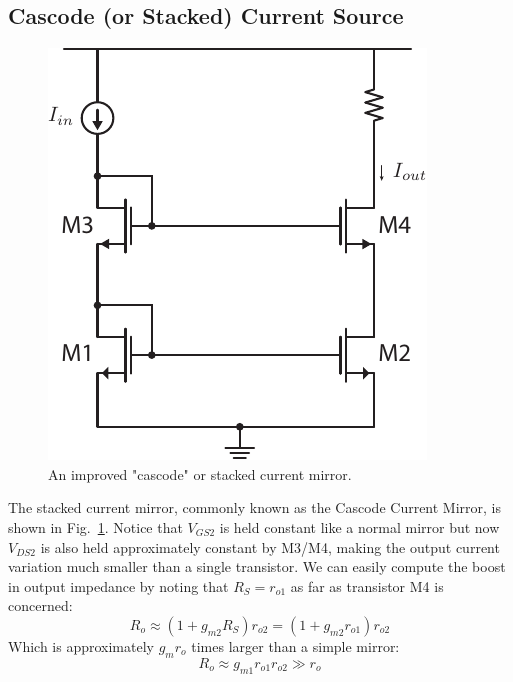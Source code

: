 \subsection{Cascode (or Stacked) Current Source}
\begin{figure}[tb]
\centering
\includegraphics[scale=1]{12mirror_cascode.pdf}
\caption{An improved "cascode" or stacked current mirror.}
\label{fig:12mirror_cascode.pdf}
\end{figure}
The stacked current mirror, commonly known as the Cascode Current Mirror, is shown in Fig.~\ref{fig:12mirror_cascode.pdf}.  Notice that $V_{GS2}$ is held constant like a normal mirror but now $V_{DS2}$ is also held  approximately constant by M3/M4, making the output current variation much smaller than a single transistor. 
We can easily compute the boost in output impedance by noting that $R_S = r_{o1}$ as far as transistor M4 is concerned: 
    \begin{equation}
        {R_o} \approx \left( {1 + {g_{m2}}{R_S}} \right){r_{o2}} = \left( {1 + {g_{m2}}{r_{o1}}} \right){r_{o2}}
    \end{equation}
Which is approximately $g_m r_o$ times larger than a simple mirror:
    \begin{equation}
        {R_o} \approx {g_{m1}}r_{o1} r_{o2} \gg {r_o}
    \end{equation}
